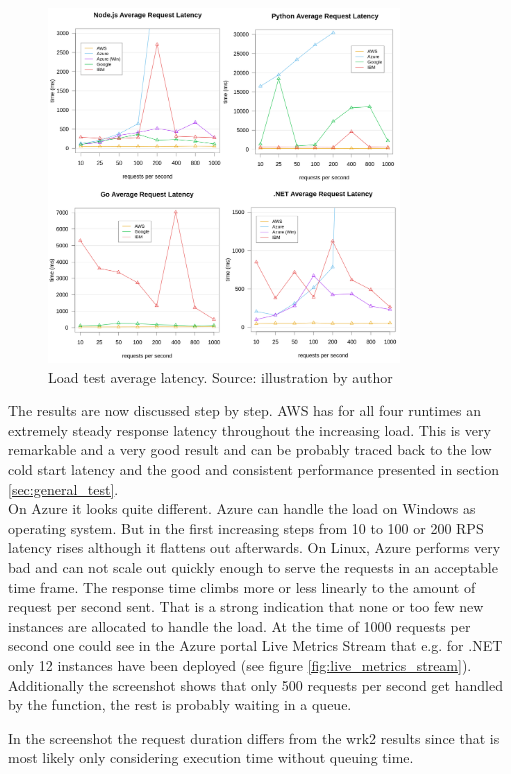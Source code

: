 \begin{figure}[htp]
\begin{center}
\includegraphics[width=0.83\textwidth]{bilder/plot_average_latency_all.png}
\captionsetup{justification=centering, labelfont=bf}
\caption[Load test average latency]{Load test average latency. Source: illustration by author}
\label{fig:load_test_latency_all}
\end{center}
\end{figure}

The results are now discussed step by step. \gls{AWS} has for all four runtimes an extremely steady response latency throughout the increasing load. This is very remarkable and a very good result and can be probably traced back to the low cold start latency and the good and consistent performance presented in section \ref{sec:general_test}.\\
On Azure it looks quite different. Azure can handle the load on Windows as operating system. But in the first increasing steps from 10 to 100 or 200 RPS latency rises although it flattens out afterwards. On Linux, Azure performs very bad and can not scale out quickly enough to serve the requests in an acceptable time frame. The response time climbs more or less linearly to the amount of request per second sent. That is a strong indication that none or too few new instances are allocated to handle the load. At the time of 1000 requests per second one could see in the Azure portal Live Metrics Stream that e.g. for .NET only 12 instances have been deployed (see figure \ref{fig:live_metrics_stream}). Additionally the screenshot shows that only 500 requests per second get handled by the function, the rest is probably waiting in a queue.
\begin{remark}
In the screenshot the request duration differs from the wrk2 results since that is most likely only considering execution time without queuing time.
\end{remark}

